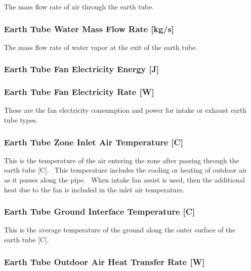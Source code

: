 The mass flow rate of air through the earth tube.

\subsubsection{Earth Tube Water Mass Flow Rate {[}kg/s{]}}\label{earth-tube-water-mass-flow-rate-kgs}

The mass flow rate of water vapor at the exit of the earth tube.

\subsubsection{Earth Tube Fan Electricity Energy {[}J{]}}\label{earth-tube-fan-electric-energy-j}

\subsubsection{Earth Tube Fan Electricity Rate {[}W{]}}\label{earth-tube-fan-electric-power-w}

These are the fan electricity consumption and power for intake or exhaust earth tube types.

\subsubsection{Earth Tube Zone Inlet Air Temperature {[}C{]}}\label{earth-tube-zone-inlet-air-temperature-c}

This is the temperature of the air entering the zone after passing through the earth tube {[}C{]}.~ This temperature includes the cooling or heating of outdoor air as it passes along the pipe. ~When intake fan assist is used, then the additional heat due to the fan is included in the inlet air temperature.

\subsubsection{Earth Tube Ground Interface Temperature {[}C{]}}\label{earth-tube-ground-interface-temperature-c}

This is the average temperature of the ground along the outer surface of the earth tube {[}C{]}.

\subsubsection{Earth Tube Outdoor Air Heat Transfer Rate {[}W{]}}\label{earth-tube-outdoor-air-heat-transfer-rate-w}

